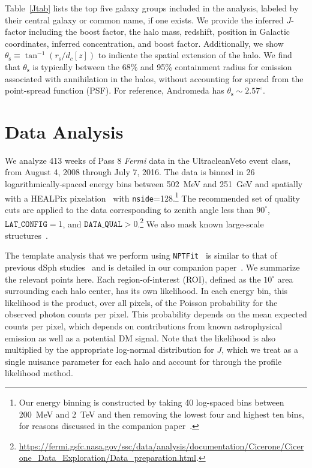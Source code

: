 Table~\ref{Jtab} lists the top five galaxy groups included in the analysis, labeled by their central galaxy or common name, if one exists.  We provide the inferred $J$-factor including the boost factor, the halo mass, redshift, position in Galactic coordinates, inferred concentration, and boost factor.  Additionally, we show $\theta_\text{s} \equiv \tan^{-1} (r_\text{s} / d_c[z])$ to indicate the spatial extension of the halo.  We find that $\theta_\text{s}$ is typically between the 68\% and 95\% containment radius for emission associated with annihilation in the halos, without accounting for spread from the point-spread function (PSF).  For reference, Andromeda has $\theta_\text{s} \sim 2.57^\circ$.  

\section{Data Analysis}

We analyze 413 weeks of Pass 8 {\it Fermi} data in the UltracleanVeto event class, from August 4, 2008 through July 7, 2016.  The data is binned in 26 logarithmically-spaced energy bins between 502~MeV and 251~GeV and spatially with a HEALPix pixelation~\cite{Gorski:2004by} with \texttt{nside}=128.\footnote{Our energy binning is constructed by taking 40 log-spaced bins between 200~MeV and 2~TeV and then removing the lowest four and highest ten bins, for reasons discussed in the companion paper~\cite{companion}. }  The recommended set of quality cuts are applied to the data corresponding to zenith angle less than $90^\circ$, $\texttt{LAT\_CONFIG}=1$, and $\texttt{DATA\_QUAL}>0$.\footnote{\url{https://fermi.gsfc.nasa.gov/ssc/data/analysis/documentation/Cicerone/Cicerone_Data_Exploration/Data_preparation.html}.}  We also mask known large-scale structures~\cite{companion}.

The template analysis that we perform using \texttt{NPTFit}~\cite{Mishra-Sharma:2016gis} is similar to that of previous dSph studies~\cite{Ackermann:2015zua,Fermi-LAT:2016uux}  and is detailed in our companion paper~\cite{companion}.  We summarize the relevant points here.  Each region-of-interest (ROI), defined as the $10^\circ$ area surrounding each halo center, has its own likelihood.  In each energy bin, this  likelihood is the product, over all pixels, of the Poisson probability for the observed photon counts per pixel.  This probability depends on the mean expected counts per pixel, which depends on contributions from known astrophysical emission as well as a potential DM signal. Note that the likelihood is also multiplied by the appropriate log-normal distribution for $J$, which we treat as a single nuisance parameter for each halo and account for through the profile likelihood method.  

